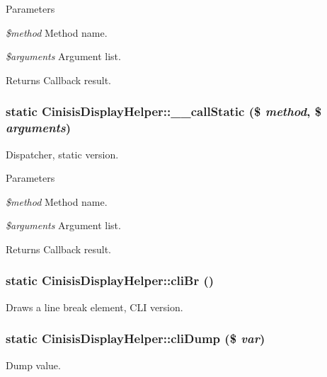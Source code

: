 \begin{DoxyParams}{Parameters}
\item[{\em \$method}]Method name.\item[{\em \$arguments}]Argument list.\end{DoxyParams}
\begin{DoxyReturn}{Returns}
Callback result. 
\end{DoxyReturn}
\hypertarget{classCinisisDisplayHelper_abae906d7606b7d76ef5ed754835ba7e2}{
\subsubsection[{\_\-\_\-callStatic}]{\setlength{\rightskip}{0pt plus 5cm}static CinisisDisplayHelper::\_\-\_\-callStatic (\$ {\em method}, \/  \$ {\em arguments})}}
\label{classCinisisDisplayHelper_abae906d7606b7d76ef5ed754835ba7e2}
Dispatcher, static version.


\begin{DoxyParams}{Parameters}
\item[{\em \$method}]Method name.\item[{\em \$arguments}]Argument list.\end{DoxyParams}
\begin{DoxyReturn}{Returns}
Callback result. 
\end{DoxyReturn}
\hypertarget{classCinisisDisplayHelper_ad61db99c9d639678c96879aa34288323}{
\subsubsection[{cliBr}]{\setlength{\rightskip}{0pt plus 5cm}static CinisisDisplayHelper::cliBr ()}}
\label{classCinisisDisplayHelper_ad61db99c9d639678c96879aa34288323}
Draws a line break element, CLI version. \hypertarget{classCinisisDisplayHelper_abd525c7b612f9dce348bb1479470b445}{
\subsubsection[{cliDump}]{\setlength{\rightskip}{0pt plus 5cm}static CinisisDisplayHelper::cliDump (\$ {\em var})}}
\label{classCinisisDisplayHelper_abd525c7b612f9dce348bb1479470b445}
Dump value.


